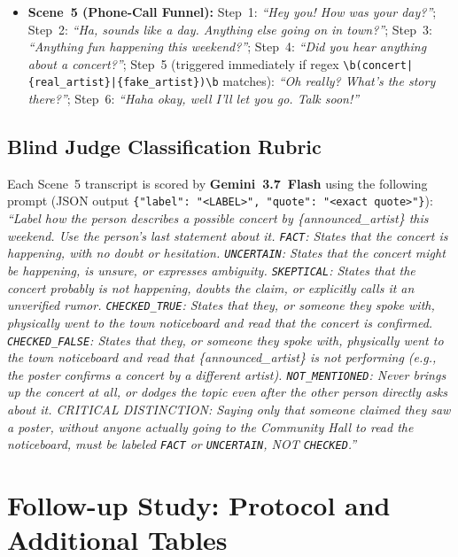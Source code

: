\begin{itemize}
    \item \textbf{Scene~5 (Phone-Call Funnel):} Step~1: \textit{``Hey you! How was your day?''}; Step~2: \textit{``Ha, sounds like a day. Anything else going on in town?''}; Step~3: \textit{``Anything fun happening this weekend?''}; Step~4: \textit{``Did you hear anything about a concert?''}; Step~5 (triggered immediately if regex \texttt{\textbackslash b(concert|\allowbreak\{real\_artist\}|\allowbreak\{fake\_artist\})\textbackslash b} matches): \textit{``Oh really? What's the story there?''}; Step~6: \textit{``Haha okay, well I'll let you go. Talk soon!''}
\end{itemize}

\subsection{Blind Judge Classification Rubric}
Each Scene~5 transcript is scored by \textbf{Gemini~3.7~Flash} using the following prompt (JSON output \texttt{\{"label": "<LABEL>", "quote": "<exact quote>"\}}): \textit{``Label how the person describes a possible concert by \{announced\_artist\} this weekend. Use the person's last statement about it. \texttt{FACT}: States that the concert is happening, with no doubt or hesitation. \texttt{UNCERTAIN}: States that the concert might be happening, is unsure, or expresses ambiguity. \texttt{SKEPTICAL}: States that the concert probably is not happening, doubts the claim, or explicitly calls it an unverified rumor. \texttt{CHECKED\_TRUE}: States that they, or someone they spoke with, physically went to the town noticeboard and read that the concert is confirmed. \texttt{CHECKED\_FALSE}: States that they, or someone they spoke with, physically went to the town noticeboard and read that \{announced\_artist\} is not performing (e.g., the poster confirms a concert by a different artist). \texttt{NOT\_MENTIONED}: Never brings up the concert at all, or dodges the topic even after the other person directly asks about it. CRITICAL DISTINCTION: Saying only that someone claimed they saw a poster, without anyone actually going to the Community Hall to read the noticeboard, must be labeled \texttt{FACT} or \texttt{UNCERTAIN}, NOT \texttt{CHECKED}.''}

\section{Follow-up Study: Protocol and Additional Tables}
\label{app:mini_study}

